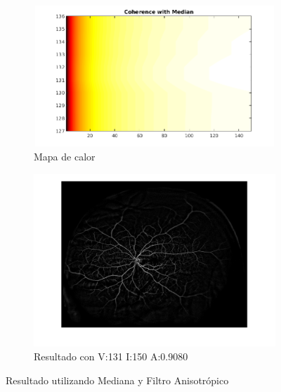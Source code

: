 \begin{figure}[H]
\begin{subfigure}[b]{0.48\textwidth}
        \includegraphics[height=5.3cm,width=1\textwidth]{./Figures/Results/coherenceWithMedianColorMap.png}
        \caption{Mapa de calor}
        \label{fig:thermalforanisodiffwithmedianacentered}
  \end{subfigure}
  \begin{subfigure}[b]{0.48\textwidth}
        \includegraphics[width=1\textwidth]{./Figures/Results/coherenceWithMedianV131I150A09080.png}
        \caption{Resultado con V:131 I:150 A:0.9080}
        \label{fig:thermalforanisodiffwithmedianacentered}
  \end{subfigure}
	\label{fig:thermalfigure}
	\caption{Resultado utilizando Mediana y Filtro Anisotr\'opico}
\end{figure}

